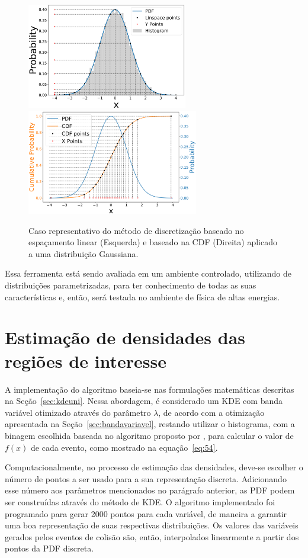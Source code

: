 \begin{figure}[H]
		\centering
		\includegraphics[width=7cm]{./textuais/algoritmo/figuras/2.pdf}
        \includegraphics[width=7.5cm]{./textuais/algoritmo/figuras/1.pdf}
		\caption{Caso representativo do método de discretização baseado no espaçamento linear (Esquerda) e baseado na \ac{CDF} (Direita) aplicado a uma distribuição Gaussiana.}
		\label{fig:linspace}
\end{figure}

Essa ferramenta está sendo avaliada em um ambiente controlado, utilizando de distribuições parametrizadas, para ter conhecimento de todas as suas características e, então, será testada no ambiente de física de altas energias.

\section{Estimação de densidades das regiões de interesse} \label{sec:difest}

A implementação do algoritmo baseia-se nas formulações matemáticas descritas na Seção~\ref{sec:kdeuni}. Nessa abordagem, é considerado um KDE com banda variável otimizado através do parâmetro $\lambda$, de acordo com a otimização apresentada na Seção~\ref{sec:bandavariavel}, restando utilizar o histograma, com a binagem escolhida baseada no algoritmo proposto por \cite{shimazaki2007method}, para calcular o valor de $f\left( x \right)$ de cada evento, como mostrado na equação~\ref{eq:54}.

Computacionalmente, no processo de estimação das densidades, deve-se escolher o número de pontos a ser usado para a sua representação discreta. Adicionando esse número aos parâmetros mencionados no parágrafo anterior, as PDF podem ser construídas através do método de KDE. O algoritmo implementado foi programado para gerar 2000 pontos para cada variável, de maneira a garantir uma boa representação de suas respectivas distribuições. Os valores das variáveis gerados pelos eventos de colisão são, então, interpolados linearmente a partir dos pontos da PDF discreta.

